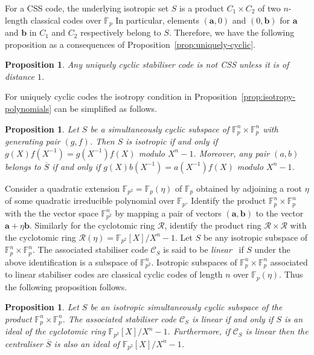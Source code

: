 \documentclass[conference]{IEEEtran}
\renewcommand{\=}{\approx}
\newcommand{\R}{\mathcal{R}}
\newcommand{\centraliser}[1]{\ensuremath{\overline{#1}}}
\newtheorem{proposition}[theorem]{Proposition}
\begin{document}
For a CSS code, the underlying isotropic set $S$ is a product
$C_1\times C_2$ of two $n$-length classical codes over $\mathbb{F}_p$
In particular, elements $(\mathbf{a},0)$ and $(0,\mathbf{b})$ for
$\mathbf{a}$ and $\mathbf{b}$ in $C_1$ and $C_2$ respectively belong
to $S$.  Therefore, we have the following proposition as a
consequences of Proposition~\ref{prop:uniquely-cyclic}.

\begin{proposition}\label{prop:uniquely-cyclic-is-non-css}
  Any uniquely cyclic stabiliser code is not CSS unless it is of
  distance $1$.
\end{proposition}


For uniquely cyclic codes the isotropy condition in
Proposition~\ref{prop:isotropy-polynomials} can be simplified as
follows.

\begin{proposition}\label{prop:isotropy-uniquely-cyclic}
  Let $S$ be a simultaneously cyclic subspace of $\mathbb{F}_p^n
  \times \mathbb{F}_p^n$ with generating pair $(g,f)$. Then $S$ is
  isotropic if and only if $g(X)f(X^{-1})=g(X^{-1})f(X)$ modulo $X^n
  -1$. Moreover, any pair $(a,b)$ belongs to $\centraliser{S}$ if and
  only if $g(X)b(X^{-1})=a(X^{-1})f(X)$ modulo $X^n-1$.
\end{proposition}

Consider a quadratic extension $\mathbb{F}_{p^2}=\mathbb{F}_p(\eta)$
of $\mathbb{F}_p$ obtained by adjoining a root $\eta$ of some quadratic
irreducible polynomial over $\mathbb{F}_p$. Identify the product
$\mathbb{F}_p^n \times \mathbb{F}_p^n$ with the the vector space
$\mathbb{F}_{p^2}^n$ by mapping a pair of vectors $(\mathbf{a},
\mathbf{b})$ to the vector $\mathbf{a} + \eta \mathbf{b}$. Similarly
for the cyclotomic ring $\R$, identify the product ring $\R \times \R$
with the cyclotomic ring $\R(\eta) = \mathbb{F}_{p^2}[X]/X^n -1$.  Let
$S$ be any isotropic subspace of $\mathbb{F}_p^n \times
\mathbb{F}_p^n$. The associated stabiliser code $\mathcal{C}_S$ is
said to be \emph{linear}~\cite{calderbank98quantum} if $S$ under the
above identification is a subspace of $\mathbb{F}_{p^2}^n$.  Isotropic
subspaces of $\mathbb{F}_p^n \times \mathbb{F}_p^n$ associated to
linear stabiliser codes are classical cyclic codes of length $n$ over
$\mathbb{F}_p(\eta)$. Thus the following proposition follows.

\begin{proposition}\label{prop:centraliser-ideal-connection}
  Let $S$ be an isotropic simultaneously cyclic subspace of the product
  $\mathbb{F}_p^n \times \mathbb{F}_p^n$. The associated stabiliser
  code $\mathcal{C}_S$ is linear if and only if $S$ is an ideal of the
  cyclotomic ring $\mathbb{F}_{p^2}[X]/X^n -1$. Furthermore, if
  $\mathcal{C}_S$ is linear then the centraliser $\centraliser{S}$ is
  also an ideal of $\mathbb{F}_{p^2}[X]/X^n -1$.
\end{proposition}
\end{document}
